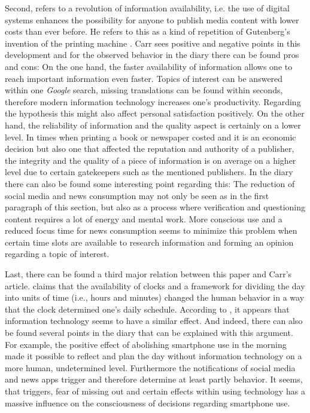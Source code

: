 \documentclass[11pt,a4paper]{article}
\begin{document}
Second, \cite{Carr.2008} refers to a revolution of information availability, i.e. the use of digital systems enhances the possibility for anyone to publish media content with lower costs than ever before. He refers to this as a kind of repetition of Gutenberg's invention of the printing machine \citep{Carr.2008}. Carr sees positive and negative points in this development and for the observed behavior in the diary there can be found pros and cons: On the one hand, the faster availability of information allows one to reach important information even faster. Topics of interest can be answered within one \textit{Google} search, missing translations can be found within seconds, therefore modern information technology increases one's productivity. Regarding the hypothesis this might also affect personal satisfaction positively. On the other hand, the reliability of information and the quality aspect is certainly on a lower level. In times when printing a book or newspaper costed and it is an economic decision but also one that affected the reputation and authority of a publisher, the integrity and the quality of a piece of information is on average on a higher level due to certain gatekeepers such as the mentioned publishers. In the diary there can also be found some interesting point regarding this: The reduction of social media and news consumption may not only be seen as in the first paragraph of this section, but also as a process where verification and questioning content requires a lot of energy and mental work. More conscious use and a reduced focus time for news consumption seems to minimize this problem when certain time slots are available to research information and forming an opinion regarding a topic of interest.

Last, there can be found a third major relation between this paper and Carr's article. \cite{Carr.2008} claims that the availability of clocks and a framework for dividing the day into units of time (i.e., hours and minutes) changed the human behavior in a way that the clock determined one's daily schedule. According to \cite{Carr.2008}, it appears that information technology seems to have a similar effect. And indeed, there can also be found several points in the diary that can be explained with this argument. For example, the positive effect of abolishing smartphone use in the morning made it possible to reflect and plan the day without information technology on a more human, undetermined level. Furthermore the notifications of social media and news apps trigger and therefore determine at least partly behavior. It seems, that triggers, fear of missing out and certain effects within using technology has a massive influence on the consciousness of decisions regarding smartphone use.
\end{document}
